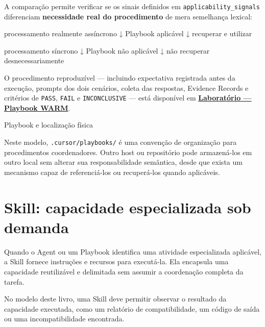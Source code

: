 \documentclass[
  10pt,
  a4paper,
  oneside]{book}
\newenvironment{Shaded}{}{}
\newcommand{\NormalTok}[1]{#1}
\renewenvironment{Shaded}{\begin{snugshade}}{\end{snugshade}}%
\begin{document}
A comparação permite verificar se os sinais definidos em
\texttt{applicability\_signals} diferenciam \textbf{necessidade real do
procedimento} de mera semelhança lexical:

\begin{Shaded}
\begin{Highlighting}[]
\NormalTok{processamento realmente assíncrono}
\NormalTok{        ↓}
\NormalTok{Playbook aplicável}
\NormalTok{        ↓}
\NormalTok{recuperar e utilizar}

\NormalTok{processamento síncrono}
\NormalTok{        ↓}
\NormalTok{Playbook não aplicável}
\NormalTok{        ↓}
\NormalTok{não recuperar desnecessariamente}
\end{Highlighting}
\end{Shaded}

O procedimento reproduzível --- incluindo expectativa registrada antes
da execução, prompts dos dois cenários, coleta das respostas, Evidence
Records e critérios de \texttt{PASS}, \texttt{FAIL} e
\texttt{INCONCLUSIVE} --- está disponível em
\textbf{\protect\hyperlink{laboratorio-playbook-warm}{Laboratório ---
Playbook WARM}}.

\begin{infobox}{Playbook e localização física}

Neste modelo, \texttt{.cursor/playbooks/} é uma convenção de organização
para procedimentos coordenadores. Outro host ou repositório pode
armazená-los em outro local sem alterar sua responsabilidade semântica,
desde que exista um mecanismo capaz de referenciá-los ou recuperá-los
quando aplicáveis.

\end{infobox}

\hypertarget{skill-capacidade-especializada-sob-demanda}{%
\section{Skill: capacidade especializada sob
demanda}\label{skill-capacidade-especializada-sob-demanda}}

Quando o Agent ou um Playbook identifica uma atividade especializada
aplicável, a Skill fornece instruções e recursos para executá-la. Ela
encapsula uma capacidade reutilizável e delimitada sem assumir a
coordenação completa da tarefa.

No modelo deste livro, uma Skill deve permitir observar o resultado da
capacidade executada, como um relatório de compatibilidade, um código de
saída ou uma incompatibilidade encontrada.
\end{document}
